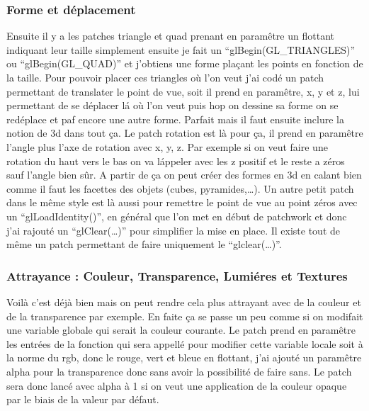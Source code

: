 \subsubsection{Forme et d\'eplacement}
Ensuite il y a les patches triangle et quad prenant en param\^etre un 
flottant indiquant leur taille simplement ensuite je fait un
``glBegin(GL\_TRIANGLES)'' ou ``glBegin(GL\_QUAD)'' et
j'obtiens une forme pla\c{c}ant les points en fonction
de la taille. Pour pouvoir placer ces triangles o\`u l'on veut j'ai cod\'e un
patch permettant de translater le point de vue, soit il prend en param\^etre, 
x, y et z, lui
permettant de se d\'eplacer l\'a o\`u l'on veut puis hop on dessine sa forme
on se red\'eplace et paf encore une autre forme. Parfait mais il faut ensuite 
inclure la notion de 3d dans tout \c{c}a.
Le patch rotation est l\`a pour \c{c}a,
il prend en param\^etre l'angle plus l'axe de rotation
avec x, y, z. Par exemple
si on veut faire une rotation du  haut vers le bas on va l\'appeler avec les z
positif et le reste  a z\'eros sauf l'angle bien s\^ur. A partir de \c{c}a on
peut cr\'eer des formes en 3d en calant bien comme il faut les facettes des
objets (cubes, pyramides,\ldots). Un autre petit patch dans le m\^eme style
est l\`a aussi pour remettre le point de vue au point z\'eros avec un 
``glLoadIdentity()'', en général que l'on met en début de patchwork et 
donc j'ai rajouté un ``glClear(\ldots)'' pour simplifier la mise en place. 
Il existe tout de m\^eme un patch permettant de faire uniquement le 
``glclear(\ldots)''.



\subsubsection{Attrayance : Couleur, Transparence, Lumi\'eres et Textures}

Voil\`a c'est d\'ej\`a bien mais on peut rendre cela plus attrayant avec de
 la couleur et de la transparence par exemple. En faite \c{c}a se passe un
 peu comme si on modifait une variable globale qui serait la couleur courante.
 Le patch prend en param\^etre les entr\'ees de la fonction qui sera appell\'e
 pour modifier cette variable locale soit \`a la norme du rgb, donc le rouge,
 vert et bleue en flottant, j'ai ajout\'e un param\^etre alpha pour la
 transparence donc sans avoir la possibilit\'e de faire sans. Le patch sera
 donc lanc\'e avec alpha \`a 1 si on veut une application de la couleur opaque 
par le biais de la valeur par d\'efaut.\\

